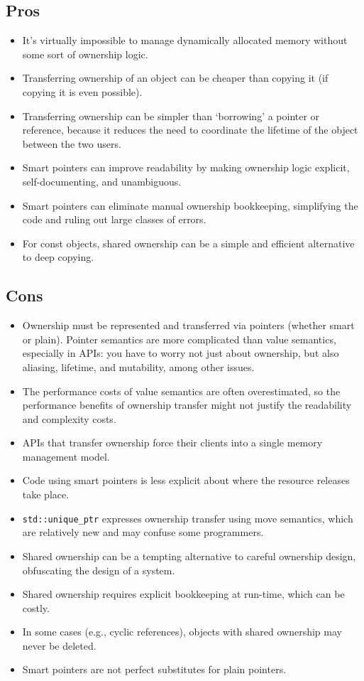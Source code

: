 \subsection{Pros}
\begin{itemize}
    \item It's virtually impossible to manage dynamically allocated memory without some sort of ownership logic.
    \item Transferring ownership of an object can be cheaper than copying it (if copying it is even possible).
    \item Transferring ownership can be simpler than \enquote*{borrowing} a pointer or reference, because it reduces the need to coordinate the lifetime of the object between the two users.
    \item Smart pointers can improve readability by making ownership logic explicit, self-documenting, and unambiguous.
    \item Smart pointers can eliminate manual ownership bookkeeping, simplifying the code and ruling out large classes of errors.
    \item For const objects, shared ownership can be a simple and efficient alternative to deep copying.
\end{itemize}

\subsection{Cons}
\begin{itemize}
    \item Ownership must be represented and transferred via pointers (whether smart or plain). Pointer semantics are more complicated than value semantics, especially in APIs: you have to worry not just about ownership, but also aliasing, lifetime, and mutability, among other issues.
    \item The performance costs of value semantics are often overestimated, so the performance benefits of ownership transfer might not justify the readability and complexity costs.
    \item APIs that transfer ownership force their clients into a single memory management model.
    \item Code using smart pointers is less explicit about where the resource releases take place.
    \item \texttt{std::unique_ptr} expresses ownership transfer using move semantics, which are relatively new and may confuse some programmers.
    \item Shared ownership can be a tempting alternative to careful ownership design, obfuscating the design of a system.
    \item Shared ownership requires explicit bookkeeping at run-time, which can be costly.
    \item In some cases (e.g., cyclic references), objects with shared ownership may never be deleted.
    \item Smart pointers are not perfect substitutes for plain pointers.
\end{itemize}

